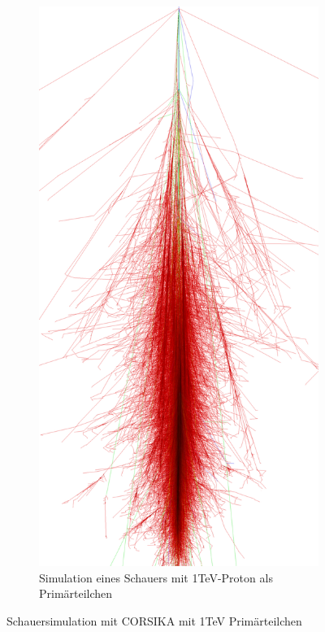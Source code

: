 \begin{figure}
\begin{subfigure}{0.4\textwidth}
 \end{subfigure}
 \hspace{2.0cm}
  \begin{subfigure}{0.4\textwidth}
  \includegraphics[width=\textwidth]{./Plots/Proton_1TeV_CORSIKA.png}
  \caption{Simulation eines Schauers mit 1TeV-Proton als Primärteilchen}
 \end{subfigure}
  \caption{ Schauersimulation mit CORSIKA mit 1TeV Primärteilchen}
  \label{CORSIKA_Schauer}
 \end{figure}



